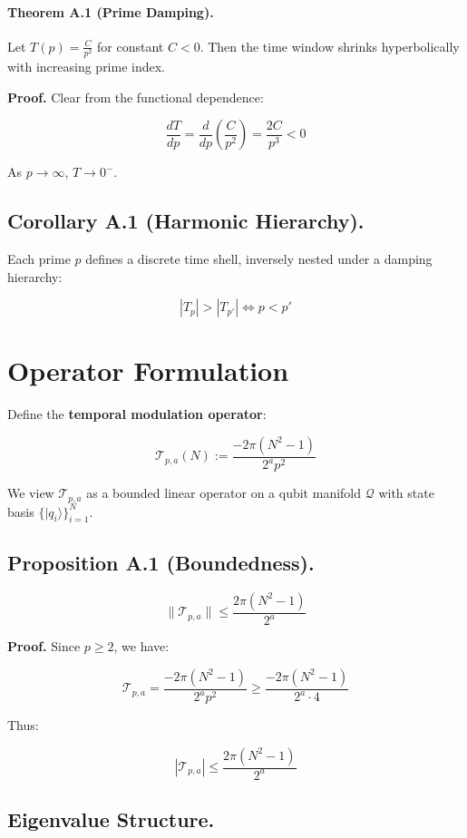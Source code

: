 \documentclass[12]{amsart}
\theoremstyle{plain}
\begin{document}
\paragraph{Theorem A.1 (Prime Damping).}

Let \( T(p) = \frac{C}{p^2} \) for constant \( C < 0 \). Then the time window shrinks hyperbolically with increasing prime index.

\textbf{Proof.} Clear from the functional dependence:

\[
\frac{dT}{dp} = \frac{d}{dp}\left( \frac{C}{p^2} \right) = \frac{2C}{p^3} < 0
\]

As \( p \to \infty \), \( T \to 0^- \). \hfill\qedsymbol

\subsection{Corollary A.1 (Harmonic Hierarchy).}

Each prime \( p \) defines a discrete time shell, inversely nested under a damping hierarchy:

\[
|T_p| > |T_{p'}| \iff p < p'
\]

\section{Operator Formulation}

Define the \textbf{temporal modulation operator}:

\[
\mathcal{T}_{p,a}(N) := \frac{-2\pi(N^2 - 1)}{2^a p^2}
\]

We view \( \mathcal{T}_{p,a} \) as a bounded linear operator on a qubit manifold \( \mathcal{Q} \) with state basis \( \{ |q_i\rangle \}_{i=1}^N \).

\subsection{Proposition A.1 (Boundedness).}

\[
\| \mathcal{T}_{p,a} \| \leq \frac{2\pi(N^2 - 1)}{2^a}
\]

\textbf{Proof.} Since \( p \geq 2 \), we have:

\[
\mathcal{T}_{p,a} = \frac{-2\pi(N^2 - 1)}{2^a p^2} \geq \frac{-2\pi(N^2 - 1)}{2^a \cdot 4}
\]

Thus:

\[
|\mathcal{T}_{p,a}| \leq \frac{2\pi(N^2 - 1)}{2^a}
\]

\hfill\qedsymbol

\subsection{Eigenvalue Structure.}
\end{document}
